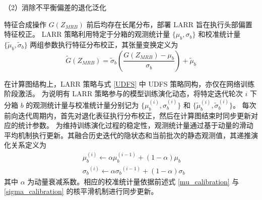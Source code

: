 （2）消除不平衡偏差的退化泛化

特征合成操作 $G(Z_{MRB})$ 前后均存在长尾分布，部署 LARR 旨在执行头部偏置特征校正。
LARR 策略利用特定于分箱的观测统计量 $\{\mu_b, \sigma_b\}$ 和校准统计量 $\{\tilde{\mu}_b, \tilde{\sigma}_b\}$ 两组参数执行特征分布校正，其张量变换定义为
% 
\begin{equation}
    \widetilde{G}(Z_{MRB})=\widetilde{\sigma}_{\textit{b}}\left(\frac{G(Z_{MRB}) - \mu_{\textit{b}}}{\sigma_{\textit{b}}}\right)+\widetilde{\mu}_{\textit{b}}
\end{equation}

在计算图结构上，LARR 策略与式 \eqref{UDFS} 中 UDFS 策略同构，亦仅在网络训练阶段激活。
为说明有 LARR 策略参与的模型训练演化动态，将特定迭代轮次 $i$ 下分箱 $b$ 的观测统计量与校准统计量分别记为 $\{\mu_b^{(i)}, \sigma_b^{(i)}\}$ 和 $\{\tilde{\mu}_b^{(i)}, \tilde{\sigma}_b^{(i)}\}$。
每次前向迭代周期内，首先对退化表征执行分布校正，然后在计算图结束时同步更新对应的统计参数。
为维持训练演化过程的稳定性，观测统计量通过基于动量的滑动平均机制执行更新。其融合历史迭代的隐状态和当前批次的静态观测值，其递推演化关系定义为
% 
\begin{align}
    & \mu_{\textit{b}}^{(i)} \leftarrow \alpha\mu_{\textit{b}}^{(i-1)}+(1-\alpha)\mu_{\textit{b}} \\
    & {\sigma_{\textit{b}}}^{(i)} \leftarrow \alpha{\sigma_{\textit{b}}}^{(i-1)}+(1-\alpha)\sigma_{\textit{b}}
\end{align}
% 
其中 $\alpha$ 为动量衰减系数。相应的校准统计量依据前述式 \eqref{mu_calibration} 与 \eqref{sigma_calibration} 的核平滑机制进行同步更新。


